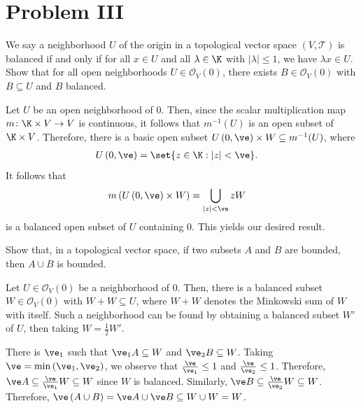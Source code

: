 \documentclass[10pt]{mypackage}
\begin{document}
\section{Problem III}%
\begin{problem}
  We say a neighborhood $U$ of the origin in a topological vector space $\left( V,\mathcal{T} \right)$ is balanced if and only if for all $x\in U$ and all $\lambda\in \K$ with $\left\vert \lambda \right\vert\leq 1$, we have $\lambda x\in U$. Show that for all open neighborhoods $U\in \mathcal{O}_V(0)$, there exists $B\in \mathcal{O}_V(0)$ with $B\subseteq U$ and $B$ balanced.
\end{problem}
\begin{solution}
  Let $U$ be an open neighborhood of $0$. Then, since the scalar multiplication map $m\colon \K\times V\rightarrow V$ is continuous, it follows that $m^{-1}\left( U \right)$ is an open subset of $\K\times V$. Therefore, there is a basic open subset $U\left( 0,\ve \right)\times W\subseteq m^{-1}(U)$, where
  \begin{align*}
    U\left( 0,\ve \right) &= \set{z\in \K : \left\vert z \right\vert < \ve}.
  \end{align*}
  It follows that
  \begin{align*}
    m\left( U\left( 0,\ve \right)\times W \right) &= \bigcup_{\left\vert z \right\vert < \ve} zW
  \end{align*}
  is a balanced open subset of $U$ containing $0$. This yields our desired result.
\end{solution}
\begin{problem}
  Show that, in a topological vector space, if two subsets $A$ and $B$ are bounded, then $A\cup B$ is bounded.
\end{problem}
\begin{solution}
  Let $U\in \mathcal{O}_V(0)$ be a neighborhood of $0$. Then, there is a balanced subset $W\in \mathcal{O}_V(0)$ with $W + W\subseteq U$, where $W + W$ denotes the Minkowski sum of $W$ with itself. Such a neighborhood can be found by obtaining a balanced subset $W'$ of $U$, then taking $W = \frac{1}{2}W'$.

  There is $\ve_1$ such that $\ve_1 A \subseteq W$ and $\ve_2 B \subseteq W$. Taking $\ve = \min\left( \ve_1,\ve_2 \right)$, we observe that $\frac{\ve}{\ve_1}\leq 1$ and $\frac{\ve}{\ve_2}\leq 1$. Therefore, $\ve A \subseteq \frac{\ve}{\ve_1}W\subseteq W$ since $W$ is balanced. Similarly, $\ve B \subseteq \frac{\ve}{\ve_2}W\subseteq W$. Therefore, $\ve\left( A\cup B \right) = \ve A \cup \ve B \subseteq W\cup W = W$.
\end{solution}
\end{document}
